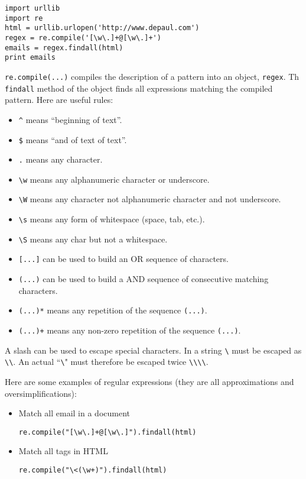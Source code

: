 \documentclass[justified,sixbynine]{tufte-book}
\def\ft{\small\tt}
\theoremstyle{plain}%
\theoremstyle{definition}
\theoremstyle{remark}
\begin{document}
\begin{fullwidth}
\begin{lstlisting}
import urllib
import re
html = urllib.urlopen('http://www.depaul.com')
regex = re.compile('[\w\.]+@[\w\.]+')
emails = regex.findall(html)
print emails
\end{lstlisting}

{\ft re.compile(...)} compiles the description of a pattern into an object, {\ft regex}. Th {\ft findall} method of the object finds all expressions matching the compiled pattern. Here are useful rules:

\begin{itemize}
\item {\ft \textasciicircum} means ``beginning of text''.
\item {\ft \$} means ``and of text of text''.
\item {\ft .} means any character.
\item {\ft \verb!\!w} means any alphanumeric character or underscore.
\item {\ft \verb!\!W} means any character not alphanumeric character and not underscore.
\item {\ft \verb!\!s} means any form of whitespace (space, tab, etc.).
\item {\ft \verb!\!S} means any char but not a whitespace.
\item {\ft [...]} can be used to build an OR sequence of characters.
\item {\ft (...)} can be used to build a AND sequence of consecutive matching characters.
\item {\ft (...)*} means any repetition of the sequence {\ft (...)}.
\item {\ft (...)+} means any non-zero repetition of the sequence {\ft (...)}.
\end{itemize}
A slash can be used to escape special characters. In a string {\ft \verb!\!} must be escaped as {\ft \verb!\!\verb!\!}. An actual ``\verb!\!" must therefore be escaped twice {\ft \verb!\!\verb!\!\verb!\!\verb!\!}.

Here are some examples of regular expressions (they are all approximations and oversimplifications):

\begin{itemize}
\item Match all email in a document
\begin{lstlisting}
re.compile("[\w\.]+@[\w\.]").findall(html)
\end{lstlisting}

\item Match all tags in HTML
\begin{lstlisting}
re.compile("\<(\w+)").findall(html)
\end{lstlisting}


\end{itemize}
\end{fullwidth}
\end{document}
